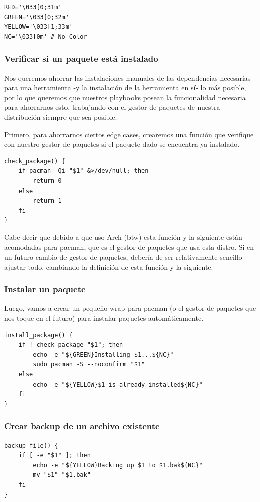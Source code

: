 \documentclass[11pt]{article}
\begin{document}
\begin{verbatim}
RED='\033[0;31m'
GREEN='\033[0;32m'
YELLOW='\033[1;33m'
NC='\033[0m' # No Color
\end{verbatim}
\subsubsection{Verificar si un paquete está instalado}
\label{sec:org1d3eab9}
Nos queremos ahorrar las instalaciones manuales de las dependencias necesarias para una herramienta -y la instalación de la herramienta en sí- lo más posible, por lo que queremos que nuestros playbooks posean la funcionalidad necesaria para ahorrarnos esto, trabajando con el gestor de paquetes de nuestra distribución siempre que sea posible.

Primero, para ahorrarnos ciertos edge cases, crearemos una función que verifique con nuestro gestor de paquetes si el paquete dado se encuentra ya instalado.

\begin{verbatim}
check_package() {
    if pacman -Qi "$1" &>/dev/null; then
        return 0
    else
        return 1
    fi
}
\end{verbatim}

Cabe decir que debido a que uso Arch (btw) esta función y la siguiente están acomodadas para pacman, que es el gestor de paquetes que usa esta distro. Si en un futuro cambio de gestor de paquetes, debería de ser relativamente sencillo ajustar todo, cambiando la definición de esta función y la siguiente.
\subsubsection{Instalar un paquete}
\label{sec:org90eed6d}
Luego, vamos a crear un pequeño wrap para pacman (o el gestor de paquetes que nos toque en el futuro) para instalar paquetes automáticamente.

\begin{verbatim}
install_package() {
    if ! check_package "$1"; then
        echo -e "${GREEN}Installing $1...${NC}"
        sudo pacman -S --noconfirm "$1"
    else
        echo -e "${YELLOW}$1 is already installed${NC}"
    fi
}
\end{verbatim}
\subsubsection{Crear backup de un archivo existente}
\label{sec:org6d3a00a}

\begin{verbatim}
backup_file() {
    if [ -e "$1" ]; then
        echo -e "${YELLOW}Backing up $1 to $1.bak${NC}"
        mv "$1" "$1.bak"
    fi
}
\end{verbatim}
\end{document}
